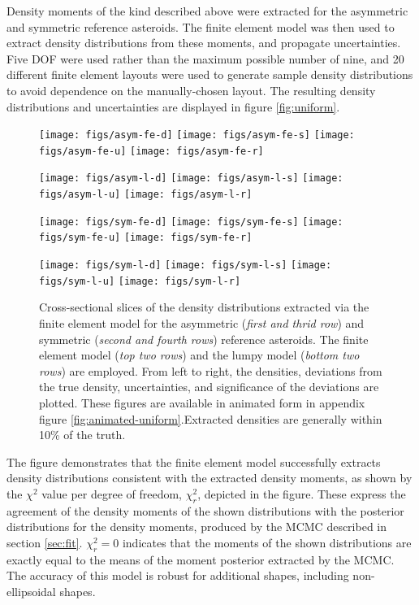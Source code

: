 \documentclass[fleqn,usenatbib]{mnras}
\begin{document}
Density moments of the kind described above were extracted for the asymmetric and symmetric reference asteroids. The finite element model was then used to extract density distributions from these moments, and propagate uncertainties. Five DOF were used rather than the maximum possible number of nine, and 20 different finite element layouts were used to generate sample density distributions to avoid dependence on the manually-chosen layout. The resulting density distributions and uncertainties are displayed in figure \ref{fig:uniform}.
\begin{figure}
  \texttt{[image: figs/asym-fe-d]}\hfill
  \texttt{[image: figs/asym-fe-s]}\hfill
  \texttt{[image: figs/asym-fe-u]}\hfill
  \texttt{[image: figs/asym-fe-r]}

  \texttt{[image: figs/asym-l-d]}\hfill
  \texttt{[image: figs/asym-l-s]}\hfill
  \texttt{[image: figs/asym-l-u]}\hfill
  \texttt{[image: figs/asym-l-r]}

  \texttt{[image: figs/sym-fe-d]}\hfill
  \texttt{[image: figs/sym-fe-s]}\hfill
  \texttt{[image: figs/sym-fe-u]}\hfill
  \texttt{[image: figs/sym-fe-r]}

  \texttt{[image: figs/sym-l-d]}\hfill
  \texttt{[image: figs/sym-l-s]}\hfill
  \texttt{[image: figs/sym-l-u]}\hfill
  \texttt{[image: figs/sym-l-r]}

  \caption{Cross-sectional slices of the density distributions extracted via the finite element model for the asymmetric (\textit{first and thrid row}) and symmetric (\textit{second and fourth rows}) reference asteroids. The finite element model (\textit{top two rows}) and the lumpy model (\textit{bottom two rows}) are employed. From left to right, the densities, deviations from the true density, uncertainties, and significance of the deviations are plotted. These figures are available in animated form in appendix figure \ref{fig:animated-uniform}.Extracted densities are generally within 10\% of the truth.}
  \label{fig:den-uniform}
\end{figure}

The figure demonstrates that the finite element model successfully extracts density distributions consistent with the extracted density moments, as shown by the $\chi^2$ value per degree of freedom, $\chi^2_r$, depicted in the figure. These express the agreement of the density moments of the shown distributions with the posterior distributions for the density moments, produced by the MCMC described in section \ref{sec:fit}. $\chi^2_r = 0$ indicates that the moments of the shown distributions are exactly equal to the means of the moment posterior extracted by the MCMC. The accuracy of this model is robust for additional shapes, including non-ellipsoidal shapes.
\end{document}
